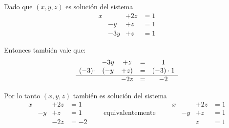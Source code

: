 \documentclass[handout]{beamer} %
\renewcommand{\_}[1]{_{\left( #1 \right)}}
\renewcommand{\^}[1]{^{\left( #1 \right)}}
\begin{document}
\begin{frame}
Dado que $(x,y,z)$ es solución del sistema
\begin{equation*}
\begin{matrix}
x &  & +2z & = 1 \\
& -y & +z & =1\\
& -3y & +z & = 1 
\end{matrix}
\end{equation*}

 
Entonces también vale que: 
\begin{equation*}
\begin{matrix}
& -3y & +z & = & 1 \\
(-3)\cdot&( -y & +z) & = &(-3)\cdot1 \\
\hline
&   & -2z & = & -2  
\end{matrix}
\end{equation*}

 \pause
Por lo tanto $(x,y,z)$ también es solución del sistema
\begin{equation*}
\begin{matrix}
x &  & +2z & = 1 \\
& -y & +z & =1 \\
&    & -2z & = -2
\end{matrix}
\qquad\mbox{equivalentemente}\qquad
\begin{matrix}
x &  & +2z & = 1 \\
& -y & +z & =1 \\
&    & z & = 1
\end{matrix}
\end{equation*}
\end{frame}
\end{document}
